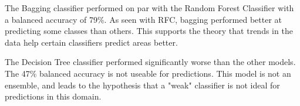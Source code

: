 \par
The Bagging classifier performed on par with the Random Forest Classifier with a balanced accuracy of 79\%.
As seen with \ac{RFC}, bagging performed better at predicting some classes than others.
This supports the theory that trends in the data help certain classifiers predict areas better.

\par
The Decision Tree classifier performed significantly worse than the other models.
The 47\% balanced accuracy is not useable for predictions.
This model is not an ensemble, and leads to the hypothesis that a "weak" classifier is not ideal for predictions in this domain.